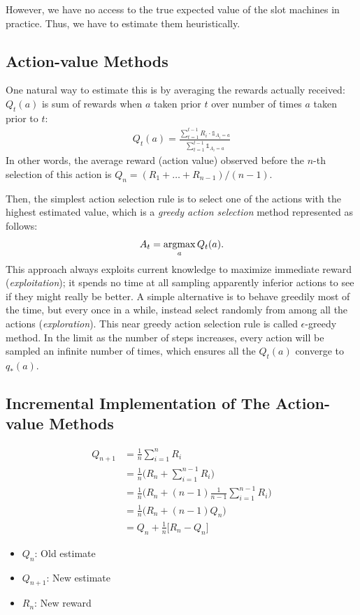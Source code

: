 However, we have no access to the true expected value of the slot machines in practice. Thus, we have to estimate them heuristically. 

\subsection{Action-value Methods}

One natural way to estimate this is by averaging the rewards actually received: $Q_t(a)$ is sum of rewards when $a$ taken prior $t$ over number of times $a$ taken prior to $t$:
\begin{align*}
	Q_t(a) = \frac{\sum_{t=1}^{t-1}R_i \cdot \mathds{1}_{A_i=a}}{\sum_{t=1}^{t-1}\mathds{1}_{A_i=a}}
\end{align*}
In other words, the average reward (action value) observed before the $n$-th selection of this action is $Q_n = (R_1+\dots+R_{n-1})/(n-1)$. %

Then, the simplest action selection rule is to select one of the actions with the highest estimated value, which is a \textit{greedy action selection} method represented as follows:
$$A_t=\operatorname*{\operatorname{argmax}}_{a}Q_t(a).$$
This approach always exploits current knowledge to maximize immediate reward (\ie \textit{exploitation}); it spends no time at all sampling apparently inferior actions to see if they might really be better. A simple alternative is to behave greedily most of the time, but every once in a while, instead select randomly from among all the actions (\ie \textit{exploration}). This near greedy action selection rule is called $\epsilon$-greedy method. In the limit as the number of steps increases, every action will be sampled an infinite number of times, which ensures all the $Q_t(a)$ converge to $q_*(a)$.

\subsection{Incremental Implementation of The Action-value Methods}
\begin{align*}
	Q_{n+1} &= \frac{1}{n}\sum_{i=1}^{n}R_i\\
	&= \frac{1}{n} \Bigg(R_n + \sum_{i=1}^{n-1}R_i \Bigg)\\
	&= \frac{1}{n} \Bigg(R_n + (n-1)\frac{1}{n-1} \sum_{i=1}^{n-1}R_i \Bigg)\\
	&= \frac{1}{n} \Bigg(R_n + (n-1)Q_n \Bigg)\\
	&=  Q_n + \frac{1}{n} \Big[R_n - Q_n \Big]
\end{align*}
\begin{itemize}
	\item $Q_n$: Old estimate
	\item $Q_{n+1}$: New estimate
	\item $R_{n}$: New reward
\end{itemize}

